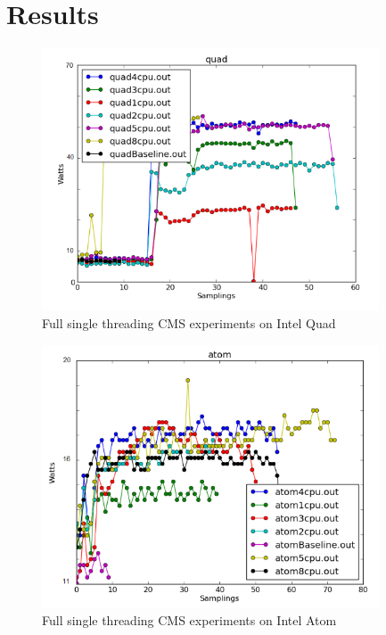 \chapter{Results}

\begin{figure}[h!]
  \centering
    \includegraphics[width=100mm]{"img/aalto/aalto_total_quad"}
    \caption{Full single threading CMS experiments on Intel Quad}
    \label{fig:aalto_quad_clamp}
\end{figure}

\begin{figure}[h!]
  \centering
    \includegraphics[width=100mm]{"img/aalto/aalto_total_atom"}
    \caption{Full single threading CMS experiments on Intel Atom}
    \label{fig:aalto_atom_clamp}
\end{figure}

